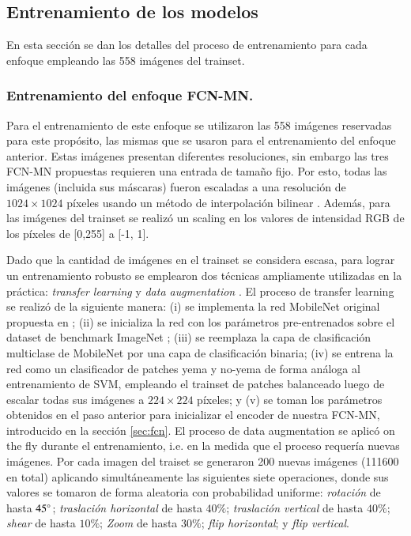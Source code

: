 \documentclass[a4paper,authoryear,review]{elsarticle}
\begin{document}
\subsection{Entrenamiento de los modelos} 
\label{sec:train}

En esta sección se dan los detalles del proceso de entrenamiento para cada enfoque empleando las 558 imágenes del trainset.


\subsubsection{Entrenamiento del enfoque FCN-MN.} 
\label{sec:fcntrain}

Para el entrenamiento de este enfoque se utilizaron las 558 imágenes reservadas para este propósito, las mismas que se usaron para el entrenamiento del enfoque anterior. Estas imágenes presentan diferentes resoluciones, sin embargo las tres FCN-MN propuestas requieren una entrada de tamaño fijo. Por esto, todas las imágenes (incluida sus máscaras) fueron escaladas a una resolución de $1024 \times 1024$ píxeles usando un método de interpolación bilinear \citep{han2013comparison}. Además, para las imágenes del trainset se realizó un scaling en los valores de intensidad RGB de los píxeles de [0,255] a [-1, 1].

Dado que la cantidad de imágenes en el trainset se considera escasa, para lograr un entrenamiento robusto se emplearon dos técnicas ampliamente utilizadas en la práctica: \emph{transfer learning} \cite{pan2009survey} y \emph{data augmentation} \cite{shorten2019survey}. El proceso de transfer learning se realizó de la siguiente manera: (i) se implementa la red MobileNet original propuesta en \citet{howard2017mobilenets}; (ii) se inicializa la red con los parámetros pre-entrenados sobre el dataset de benchmark ImageNet \cite{kornblith2019better}; (iii) se reemplaza la capa de clasificación multiclase de MobileNet por una capa de clasificación binaria; (iv) se entrena la red como un clasificador de patches yema y no-yema de forma análoga al entrenamiento de SVM, empleando el trainset de patches balanceado luego de escalar todas sus imágenes a $224 \times 224$ píxeles; y (v) se toman los parámetros obtenidos en el paso anterior para inicializar el encoder de nuestra FCN-MN, introducido en la sección \ref{sec:fcn}. El proceso de data augmentation se aplicó on the fly durante el entrenamiento, i.e. en la medida que el proceso requería nuevas imágenes. Por cada imagen del traiset se generaron 200 nuevas imágenes (111600 en total) aplicando simultáneamente las siguientes siete operaciones, donde sus valores se tomaron de forma aleatoria con probabilidad uniforme: \emph{rotación} de hasta $45\degree$; \emph{traslación horizontal} de hasta $40\%$; \emph{traslación vertical} de hasta $40\%$; \emph{shear} de hasta $10\%$; \emph{Zoom} de hasta $30\%$; \emph{flip horizontal}; y \emph{flip vertical}. 
\end{document}
